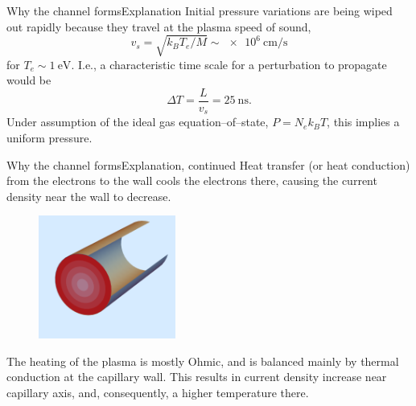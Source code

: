 \documentclass[]{beamer}
\begin{document}
  \begin{frame}{Why the channel forms}{Explanation}
    Initial pressure variations are being wiped out rapidly because they travel at the plasma speed of sound, $$v_s=\sqrt{k_B T_e/M}\sim \SI{e6}{\cm\per\s}$$ for $T_e\sim\SI{1}{\electronvolt}.$ I.e., a characteristic time scale for a perturbation to propagate would be
    $$\Delta T=\frac{L}{v_s}=\SI{25}{\ns}.$$
    Under assumption of the ideal gas equation--of--state, $P=N_e k_B T$, this implies a uniform pressure.
  \end{frame}
  \begin{frame}{Why the channel forms}{Explanation, continued}
      Heat transfer (or heat conduction) from the electrons to the wall cools the electrons there, causing the current density near the wall to decrease. 
     \begin{figure}
       \includegraphics[width=0.4\textwidth]{figures/theory/why channel forms.png}
     \end{figure}
      The heating of the plasma is mostly Ohmic, and is balanced mainly by thermal conduction at the capillary wall. This results in current density increase near capillary axis, and, consequently, a higher temperature there.
  \end{frame}
\end{document}
